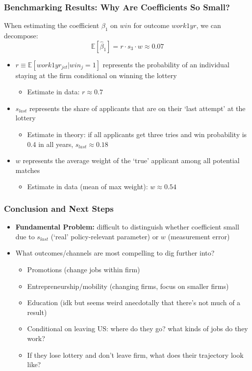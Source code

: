 \documentclass[xcolor=dvipsnames, compress, 12pt, aspectratio=169, handout]{beamer}
\begin{document}
\begin{frame}
    \frametitle{Benchmarking Results: Why Are Coefficients So Small?}
    When estimating the coefficient $\beta_1$ on $win$ for outcome $work1yr$, we can decompose:
    \begin{equation*}
        \mathbb{E}[\hat{\beta}_1] = r \cdot s_3 \cdot w \approx 0.07
    \end{equation*}
    \begin{itemize}
        \item $r \equiv \mathbb{E}[work1yr_{jct}|win_j = 1]$ represents the probability of an individual staying at the firm conditional on winning the lottery 
        \begin{itemize}
            \item Estimate in data: $r \approx 0.7$
        \end{itemize}
        \item $s_{last}$ represents the share of applicants that are on their `last attempt' at the lottery
        \begin{itemize}
            \item Estimate in theory: if all applicants get three tries and win probability is 0.4 in all years, $s_{last} \approx 0.18$
        \end{itemize}
        \item $w$ represents the average weight of the `true' applicant among all potential matches
        \begin{itemize}
            \item Estimate in data (mean of max weight): $w \approx 0.54$ 
        \end{itemize}
    \end{itemize}
\end{frame}

\begin{frame}
    \frametitle{Conclusion and Next Steps}
    \begin{itemize}
        \item \textbf{Fundamental Problem:} difficult to distinguish whether coefficient small due to $s_{last}$ (`real' policy-relevant parameter) or $w$ (measurement error)
        \vspace{2mm}
        \item What outcomes/channels are most compelling to dig further into? 
        \begin{itemize}
            \item Promotions (change jobs within firm)
            \item Entrepreneurship/mobility (changing firms, focus on smaller firms)
            \item Education (idk but seems weird anecdotally that there's not much of a result)
            \item Conditional on leaving US: where do they go? what kinds of jobs do they work?
            \item If they lose lottery and don't leave firm, what does their trajectory look like?
        \end{itemize}
    \end{itemize}
\end{frame}
\end{document}

